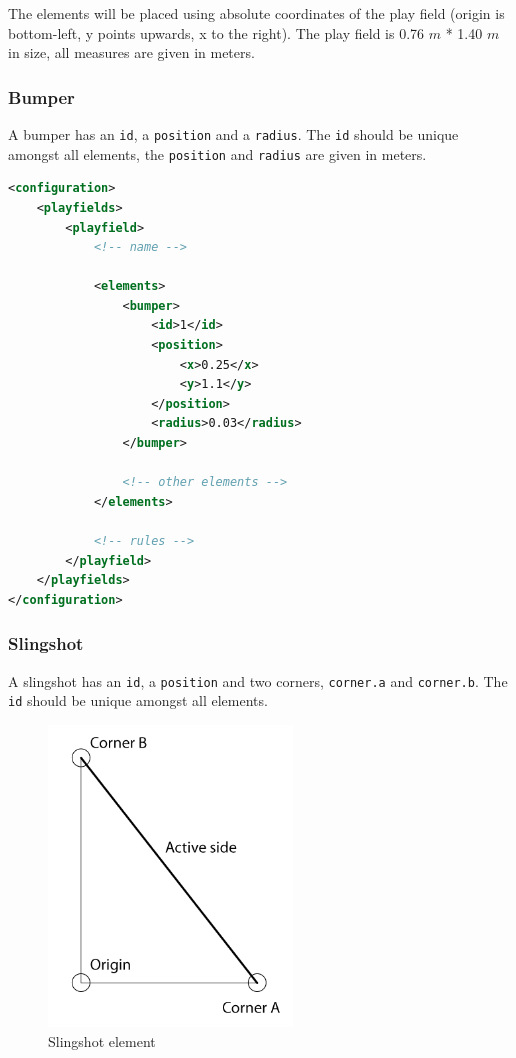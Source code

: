 \documentclass[fontsize=12pt,
               paper=a4,
               twoside=false,
               parskip=half,
               ]{scrartcl}
\begin{document}
The elements will be placed using absolute coordinates of the play field (origin is bottom-left, y points upwards, x to the right). The play field is 0.76 $m$ * 1.40 $m$ in size, all measures are given in meters.

\subsubsection{Bumper}

A bumper has an \texttt{id}, a \texttt{position} and a \texttt{radius}. The \texttt{id} should be unique amongst all elements, the \texttt{position} and \texttt{radius} are given in meters.

\begin{minipage}[]{\linewidth}
\begin{lstlisting}[language=xml,label=lst:bumper,caption={bumper}]
<configuration>
	<playfields>
		<playfield>
			<!-- name -->
			
			<elements>
				<bumper>
					<id>1</id>
					<position>
						<x>0.25</x>
						<y>1.1</y>
					</position>
					<radius>0.03</radius>
				</bumper>
				
				<!-- other elements -->
			</elements>
			
			<!-- rules -->
		</playfield>
	</playfields>
</configuration>
\end{lstlisting}
\end{minipage}

\subsubsection{Slingshot}

A slingshot has an \texttt{id}, a \texttt{position} and two corners, \texttt{corner.a} and \texttt{corner.b}. The \texttt{id} should be unique amongst all elements. 

\begin{figure}[h!]
	\centering
	\includegraphics[height=8cm]{./img/manual/slingshot-element.png}
	\caption[Slingshot element]{Slingshot element}
	\label{fig:slingshot_element}
\end{figure}
\end{document}
